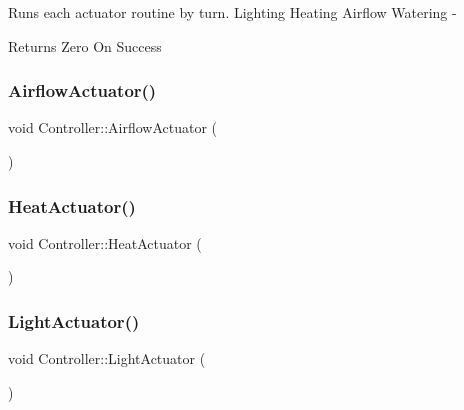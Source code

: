 Runs each actuator routine by turn. Lighting Heating Airflow Watering -\/

\begin{DoxyReturn}{Returns}
Zero On Success 
\end{DoxyReturn}
\mbox{\label{classController_ae27c7681db8370782c96769a35e09230}} 
\subsubsection{\texorpdfstring{Airflow\+Actuator()}{AirflowActuator()}}
{\footnotesize\ttfamily void Controller\+::\+Airflow\+Actuator (\begin{DoxyParamCaption}{ }\end{DoxyParamCaption})\hspace{0.3cm}{\ttfamily [private]}}

\mbox{\label{classController_af2f697200bc977e9115aff768d13fd23}} 
\subsubsection{\texorpdfstring{Heat\+Actuator()}{HeatActuator()}}
{\footnotesize\ttfamily void Controller\+::\+Heat\+Actuator (\begin{DoxyParamCaption}{ }\end{DoxyParamCaption})\hspace{0.3cm}{\ttfamily [private]}}

\mbox{\label{classController_ad45f507b92936f2964524270c62c9d07}} 
\subsubsection{\texorpdfstring{Light\+Actuator()}{LightActuator()}}
{\footnotesize\ttfamily void Controller\+::\+Light\+Actuator (\begin{DoxyParamCaption}{ }\end{DoxyParamCaption})\hspace{0.3cm}{\ttfamily [private]}}


